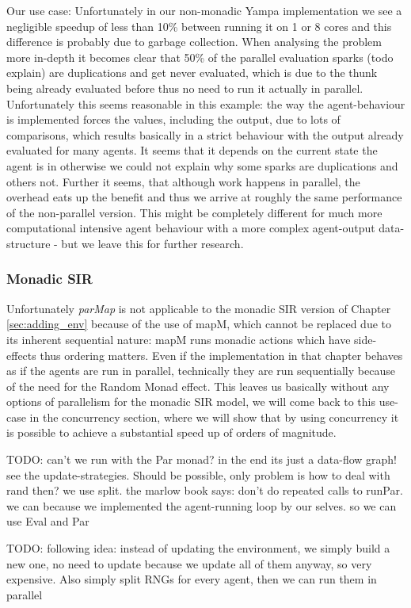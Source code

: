Our use case:
Unfortunately in our non-monadic Yampa implementation we see a negligible speedup of less than 10\% between running it on 1 or 8 cores and this difference is probably due to garbage collection. When analysing the problem more in-depth it becomes clear that 50\% of the parallel evaluation sparks (todo explain) are duplications and get never evaluated, which is due to the thunk being already evaluated before thus no need to run it actually in parallel. Unfortunately this seems reasonable in this example: the way the agent-behaviour is implemented forces the values, including the output, due to lots of comparisons, which results basically in a strict behaviour with the output already evaluated for many agents. It seems that it depends on the current state the agent is in otherwise we could not explain why some sparks are duplications and others not. Further it seems, that although work happens in parallel, the overhead eats up the benefit and thus we arrive at roughly the same performance of the non-parallel version. This might be completely different for much more computational intensive agent behaviour with a more complex agent-output data-structure - but we leave this for further research.

\subsubsection{Monadic SIR}
Unfortunately \textit{parMap} is not applicable to the monadic SIR version of Chapter \ref{sec:adding_env} because of the use of mapM, which cannot be replaced due to its inherent sequential nature: mapM runs monadic actions which have side-effects thus ordering matters. Even if the implementation in that chapter behaves as if the agents are run in parallel, technically they are run sequentially because of the need for the Random Monad effect. This leaves us basically without any options of parallelism for the monadic SIR model, we will come back to this use-case in the concurrency section, where we will show that by using concurrency it is possible to achieve a substantial speed up of orders of magnitude.

TODO: can't we run with the Par monad? in the end its just a data-flow graph! see the update-strategies. Should be possible, only problem is how to deal with rand then? we use split. the marlow book says: don't do repeated calls to runPar. we can because we implemented the agent-running loop  by our selves. so we can use Eval and Par

TODO: following idea: instead of updating the environment, we simply build a new one, no need to update because we update all of them anyway, so very expensive. Also simply split RNGs for every agent, then we can run them in parallel 


